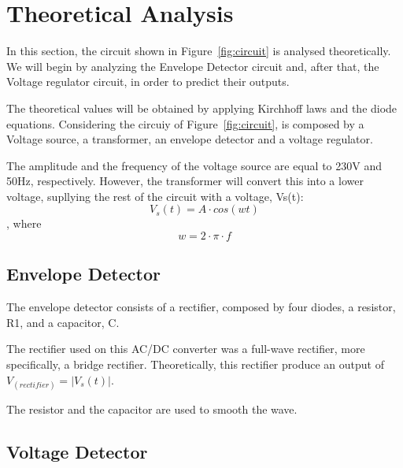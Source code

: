 \section{Theoretical Analysis}
\label{sec:analysis}

In this section, the circuit shown in Figure~\ref{fig:circuit} is analysed
theoretically. We will begin by analyzing the Envelope Detector circuit and, after that, the Voltage regulator circuit, in order to predict their outputs.

The theoretical values will be obtained by applying Kirchhoff laws and the diode equations.
Considering the circuiy of Figure~\ref{fig:circuit}, is composed by a Voltage source, a transformer, an envelope detector and a voltage regulator.

The amplitude and the frequency of the voltage source are equal to 230V and 50Hz, respectively. However, the transformer will convert this into a lower voltage, supllying the rest of the circuit with a voltage, Vs(t):
\begin{equation}
  V_s(t)= A \cdot cos(wt)
  \label{eq:Vs(t)}
\end{equation}
, where
\begin{equation}
  w= 2 \cdot \pi \cdot f
  \label{eq:Vs(t)}
\end{equation}

\subsection{Envelope Detector}
The envelope detector consists of a rectifier, composed by four diodes, a resistor, R1, and a capacitor, C.

The rectifier used on this AC/DC converter was a full-wave rectifier, more specifically, a bridge rectifier. Theoretically, this rectifier produce an output of $V_(rectifier)=|V_s(t)|$.

The resistor and the capacitor are used to smooth the wave.



\subsection{Voltage Detector}
